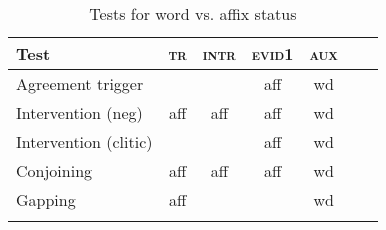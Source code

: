 \documentclass[output=paper]{langsci/langscibook}
\begin{document}
\begin{table}
  \begin{tabular}{lcccccc}
    \lsptoprule
    Test & \textsc{tr} & \textsc{intr} & \textsc{evid1} &
                                                        \textsc{aux}\\
    \midrule
    Agreement trigger & & & aff
                                       & wd \\
    Intervention (neg) & aff & aff & aff
                                                        & wd\\
    Intervention (clitic) & & & aff
                                       & wd\\
    Conjoining & aff & aff & aff
                                                        & wd\\
    Gapping & aff &&
                       & wd\\
    \lspbottomrule
  \end{tabular}
  \caption{Tests for word vs. affix status \citep{Harris09}}
  \label{tab:Wordhood}
\end{table}








\end{document}
